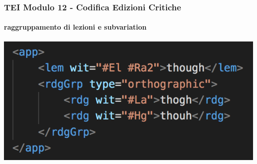  

\begin{frame}
    \frametitle{TEI Modulo 12 - Codifica Edizioni Critiche}
    \framesubtitle{raggruppamento di lezioni e subvariation}
    \addtocounter{nframe}{1}
    



    \begin{center}
        \includegraphics[width=.95\textwidth]{imgs/rdgGrp.png}
    \end{center}


\end{frame}



